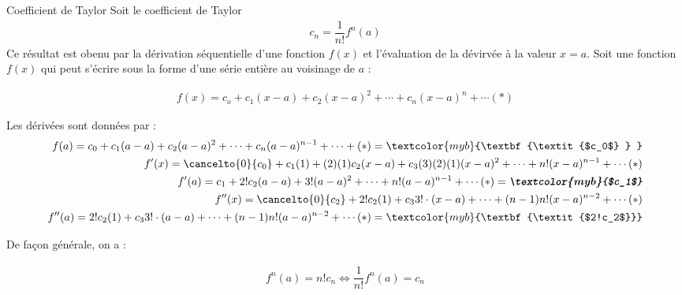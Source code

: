 \documentclass{report}
\begin{document}
\begin{Preuve}{Coefficient de Taylor}{}
    Soit le coefficient de Taylor 
    \begin{align*}
        c_n = \dfrac{1}{n!}f^{n}(a)
    \end{align*}
     Ce résultat est obenu par la dérivation séquentielle d'une fonction 
     $f(x)$ et l'évaluation de la dévirvée à la valeur $x = a$. 
     Soit une fonction $f(x)$ qui peut s'écrire sous la forme d'une série 
     entière au voisinage de $a$ : 

     \begin{align*}
        f(x) = c_o  + c_1(x - a) + c_2(x - a)^2 + \cdots + c_n(x - a)^n 
        + \cdots (*)
     \end{align*}

     Les dérivées sont données par : 
     \begin{align*}
         f(a) = c_0 + c_1(a - a) + c_2(a -a)^2 + \cdots + c_n(a - a)^{n - 1} + \cdots + (*)  
         = \textcolor{myb}{\textbf{\textit{$c_0$}  }  }  \\
        f^{\prime}(x) = 
        \cancelto{0}{c_0} + c_1(1) + (2)(1)c_2(x - a) + 
        c_3(3)(2)(1)(x - a)^2 + \cdots + n!(x - a)^{n-1} + \cdots (*) \\ 
        f^{\prime}(a) =  c_1 + 2!c_2(a - a) + 3!(a - a)^2 + \cdots + n!(a - a)^{n - 1} + 
        \cdots (*) = \textbf{\textit{\textcolor{myb}{$c_1$}}}  \\ 
         f^{\prime\prime}(x) = 
         \cancelto{0}{c_2} + 2!c_2(1) + 
        c_33!\cdot(x - a) + \cdots + (n-1)n!(x - a)^{n-2} + \cdots (*) \\ 
         f^{\prime\prime}(a) = 
          2!c_2(1) + 
        c_33!\cdot(a - a) + \cdots + (n-1)n!(a - a)^{n-2} + \cdots (*)   
        = \textcolor{myb}{\textbf{\textit{$2!c_2$}}}  
     \end{align*}

     De façon générale, on a : 

     \begin{align*}
         \boxed{f^{n}(a) = n!c_n \Leftrightarrow \dfrac{1}{n!}f^{n}(a) = c_n}
     \end{align*}






    
\end{Preuve}
\end{document}

